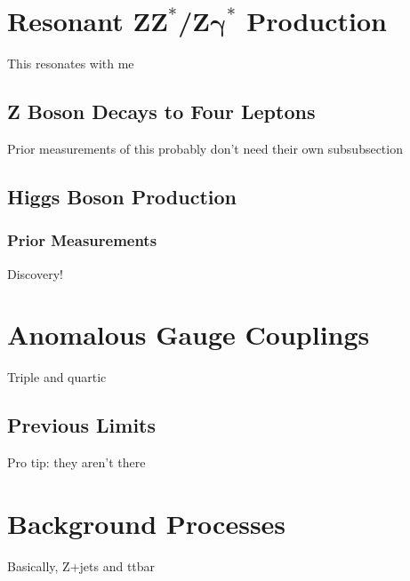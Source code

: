 \section[Resonant
         \texorpdfstring{$\mathrm{ZZ}^\ast$/$\mathrm{Z\gamma}^\ast$}
         {ZZ*/Zgamma*}
         Production]{Resonant $\mathbf{ZZ}^\ast$/$\mathbf{Z\gamma}^\ast$ Production}
This resonates with me

\subsection{Z Boson Decays to Four Leptons}
Prior measurements of this probably don't need their own subsubsection


\subsection{Higgs Boson Production}\label{sec:Hproduction}

\subsubsection{Prior Measurements}\label{sec:Hresults}
Discovery!



\section{Anomalous Gauge Couplings}
Triple and quartic

\subsection{Previous Limits}
Pro tip: they aren't there



\section{Background Processes}\label{sec:bkgPheno}
Basically, Z+jets and ttbar
